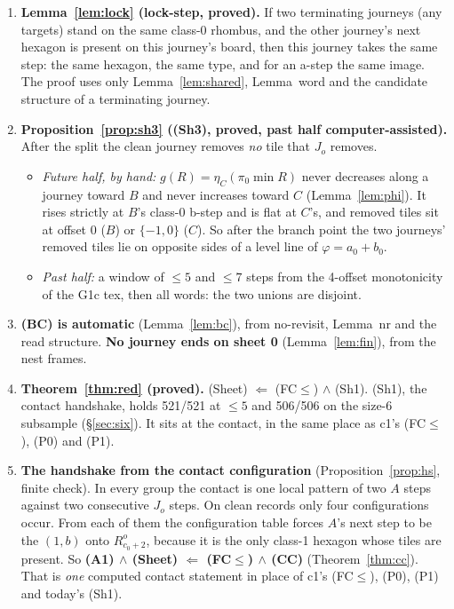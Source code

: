 \documentclass[11pt]{article}
\theoremstyle{definition}\newtheorem{definition}[theorem]{Definition}\newtheorem{remark}[theorem]{Remark}
\begin{document}
\begin{enumerate}
\item \textbf{Lemma~\ref{lem:lock} (lock-step, proved).} If two terminating journeys (any targets) stand on the same class-0 rhombus, and the other journey's next hexagon is present on this journey's board, then this journey takes the same step: the same hexagon, the same type, and for an a-step the same image. The proof uses only Lemma~\ref{lem:shared}, Lemma~word and the candidate structure of a terminating journey.
\item \textbf{Proposition~\ref{prop:sh3} ((Sh3), proved, past half computer-assisted).} After the split the clean journey removes \emph{no} tile that $J_o$ removes.
\begin{itemize}
\item \emph{Future half, by hand:} $g(R)=\eta_C(\pi_0\min R)$ never decreases along a journey toward $B$ and never increases toward $C$ (Lemma~\ref{lem:phi}). It rises strictly at $B$'s class-0 b-step and is flat at $C$'s, and removed tiles sit at offset $0$ ($B$) or $\{-1,0\}$ ($C$). So after the branch point the two journeys' removed tiles lie on opposite sides of a level line of $\varphi=a_0+b_0$.
\item \emph{Past half:} a window of $\le5$ and $\le7$ steps from the 4-offset monotonicity of the G1c tex, then all words: the two unions are disjoint.
\end{itemize}
\item \textbf{(BC) is automatic} (Lemma~\ref{lem:bc}), from no-revisit, Lemma~nr and the read structure. \textbf{No journey ends on sheet 0} (Lemma~\ref{lem:fin}), from the nest frames.
\item \textbf{Theorem~\ref{thm:red} (proved).} (Sheet) $\Leftarrow$ (FC$\le$) $\wedge$ (Sh1). (Sh1), the contact handshake, holds 521/521 at $\le5$ and 506/506 on the size-6 subsample (\S\ref{sec:six}). It sits at the contact, in the same place as c1's (FC$\le$), (P0) and (P1).
\item \textbf{The handshake from the contact configuration} (Proposition~\ref{prop:hs}, finite check). In every group the contact is one local pattern of two $A$ steps against two consecutive $J_o$ steps. On clean records only four configurations occur. From each of them the configuration table forces $A$'s next step to be the $(1,b)$ onto $R^o_{c_0+2}$, because it is the only class-1 hexagon whose tiles are present. So \textbf{(A1) $\wedge$ (Sheet) $\Leftarrow$ (FC$\le$) $\wedge$ (CC)} (Theorem~\ref{thm:cc}). That is \emph{one} computed contact statement in place of c1's (FC$\le$), (P0), (P1) and today's (Sh1).

\end{enumerate}
\end{document}
